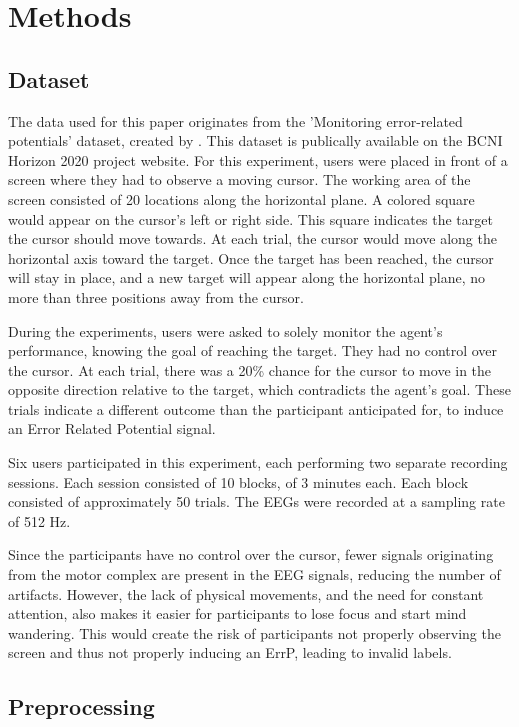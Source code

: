 \section{Methods}\label{sec:methods}

\subsection{Dataset}

The data used for this paper originates from the 'Monitoring error-related potentials' dataset, created by \cite{chavarriaga2010learning}. This dataset is publically available on the BCNI Horizon 2020 project website. For this experiment, users were placed in front of a screen where they had to observe a moving cursor. The working area of the screen consisted of 20 locations along the horizontal plane. A colored square would appear on the cursor's left or right side. This square indicates the target the cursor should move towards. At each trial, the cursor would move along the horizontal axis toward the target. Once the target has been reached, the cursor will stay in place, and a new target will appear along the horizontal plane, no more than three positions away from the cursor.

During the experiments, users were asked to solely monitor the agent's performance, knowing the goal of reaching the target. They had no control over the cursor. At each trial, there was a 20\% chance for the cursor to move in the opposite direction relative to the target, which contradicts the agent's goal. These trials indicate a different outcome than the participant anticipated for, to induce an Error Related Potential signal.

Six users participated in this experiment, each performing two separate recording sessions. Each session consisted of 10 blocks, of 3 minutes each. Each block consisted of approximately 50 trials. The EEGs were recorded at a sampling rate of 512 Hz.

Since the participants have no control over the cursor, fewer signals originating from the motor complex are present in the EEG signals, reducing the number of artifacts. However, the lack of physical movements, and the need for constant attention, also makes it easier for participants to lose focus and start mind wandering. This would create the risk of participants not properly observing the screen and thus not properly inducing an ErrP, leading to invalid labels. 

\subsection{Preprocessing}

